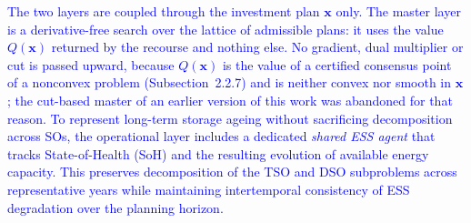 %
%




\textcolor{blue}{The two layers are coupled through the investment plan $\boldsymbol{x}$ only. The master layer
is a derivative-free search over the lattice of admissible plans: it uses the value $Q(\boldsymbol{x})$ returned
by the recourse and nothing else. No gradient, dual multiplier or cut is passed upward, because
$Q(\boldsymbol{x})$ is the value of a certified consensus point of a nonconvex problem (Subsection~2.2.7) and is
neither convex nor smooth in $\boldsymbol{x}$; the cut-based master of an earlier version of this work was
abandoned for that reason. To represent long-term storage ageing without sacrificing decomposition across
SOs, the operational layer includes a dedicated \textit{shared ESS agent} that tracks State-of-Health (SoH) and
the resulting evolution of available energy capacity. This preserves decomposition of the TSO and DSO
subproblems across representative years while maintaining intertemporal consistency of ESS degradation over
the planning horizon.}

